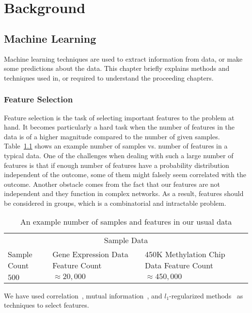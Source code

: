 \chapter{Background}

\section{Machine Learning}
Machine learning techniques are used to extract information from data, or make some predictions about the data. This chapter briefly explains methods and techniques used in, or required to understand the proceeding chapters.

\subsection{Feature Selection}
Feature selection is the task of selecting important features to the problem at hand. It becomes particularly a hard task when the number of features in the data is of a higher magnitude compared to the number of given samples. Table~\ref{tab:sample-sample-size} shows an example number of samples vs. number of features in a typical data. One of the challenges when dealing with such a large number of features is that if enough number of features have a probability distribution independent of the outcome, some of them might falsely seem correlated with the outcome. Another obstacle comes from the fact that our features are not independent and they function in complex networks. As a result, features should be considered in groups, which is a combinatorial and intractable problem.

\begin{table}[th!]
  \centering
  \begin{tabular}{p{3cm} p{3.5cm} p{4cm}}
    \hline
    \multicolumn{3}{c}{Sample Data} \\
    \cline{1-3}
    Sample Count   & Gene Expression Data Feature Count & 450K Methylation Chip Data Feature Count \\
    \hline
    $500$      & $\approx 20,000$    & $\approx 450,000$   \\
    \hline
  \end{tabular}
  \caption{An example number of samples and features in our usual data}
  \label{tab:sample-sample-size}
\end{table}

We have used correlation~\cite{correlation}, mutual information~\cite{mutual-information}, and $l_1$-regularized methods~\cite{l1-regularized} as techniques to select features.

